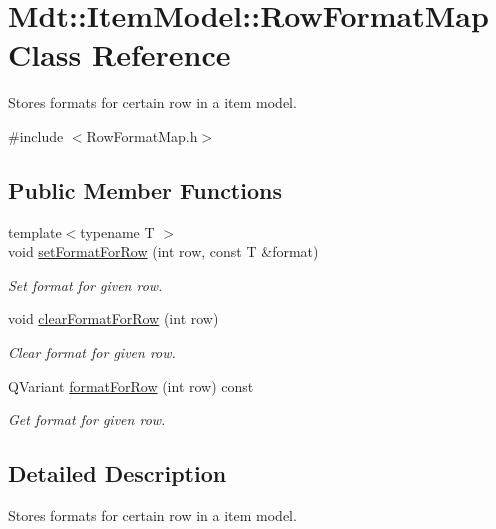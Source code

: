 \hypertarget{class_mdt_1_1_item_model_1_1_row_format_map}{}\section{Mdt\+:\+:Item\+Model\+:\+:Row\+Format\+Map Class Reference}
\label{class_mdt_1_1_item_model_1_1_row_format_map}


Stores formats for certain row in a item model.  




{\ttfamily \#include $<$Row\+Format\+Map.\+h$>$}

\subsection*{Public Member Functions}
\begin{DoxyCompactItemize}
\item 
{\footnotesize template$<$typename T $>$ }\\void \hyperlink{class_mdt_1_1_item_model_1_1_row_format_map_a58ace09b65c3ab2c5cc7f1c614ab7a5f}{set\+Format\+For\+Row} (int row, const T \&format)
\begin{DoxyCompactList}\small\item\em Set format for given row. \end{DoxyCompactList}\item 
void \hyperlink{class_mdt_1_1_item_model_1_1_row_format_map_a01a33cc062d5b80398fd90f7d3987ec5}{clear\+Format\+For\+Row} (int row)
\begin{DoxyCompactList}\small\item\em Clear format for given row. \end{DoxyCompactList}\item 
Q\+Variant \hyperlink{class_mdt_1_1_item_model_1_1_row_format_map_ae4cb6cb5dea94241bb79bc34b23ac637}{format\+For\+Row} (int row) const 
\begin{DoxyCompactList}\small\item\em Get format for given row. \end{DoxyCompactList}\end{DoxyCompactItemize}


\subsection{Detailed Description}
Stores formats for certain row in a item model. 

